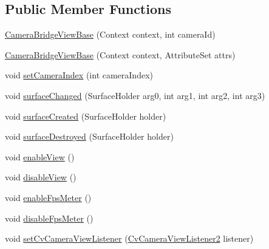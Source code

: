 \subsection*{Public Member Functions}
\begin{DoxyCompactItemize}
\item 
\mbox{\hyperlink{classorg_1_1opencv_1_1android_1_1_camera_bridge_view_base_a6bc4c88825cf0cdaccb9bbe97cd6d280}{Camera\+Bridge\+View\+Base}} (Context context, int camera\+Id)
\item 
\mbox{\hyperlink{classorg_1_1opencv_1_1android_1_1_camera_bridge_view_base_a6e901850af5a8293e9924e155b27eef5}{Camera\+Bridge\+View\+Base}} (Context context, Attribute\+Set attrs)
\item 
void \mbox{\hyperlink{classorg_1_1opencv_1_1android_1_1_camera_bridge_view_base_abd2684c41d7f5e43fb168d051392ec65}{set\+Camera\+Index}} (int camera\+Index)
\item 
void \mbox{\hyperlink{classorg_1_1opencv_1_1android_1_1_camera_bridge_view_base_ac94df92e0db8ea4ad91c2ff0c71317e0}{surface\+Changed}} (Surface\+Holder arg0, int arg1, int arg2, int arg3)
\item 
void \mbox{\hyperlink{classorg_1_1opencv_1_1android_1_1_camera_bridge_view_base_a03e25a12d1621a9e65c8f08702c22de9}{surface\+Created}} (Surface\+Holder holder)
\item 
void \mbox{\hyperlink{classorg_1_1opencv_1_1android_1_1_camera_bridge_view_base_a547f6c285f2a85ecd7ee3de772cf0d63}{surface\+Destroyed}} (Surface\+Holder holder)
\item 
void \mbox{\hyperlink{classorg_1_1opencv_1_1android_1_1_camera_bridge_view_base_a464f9c70ccfd90f8fe7cc599e79dc4fa}{enable\+View}} ()
\item 
void \mbox{\hyperlink{classorg_1_1opencv_1_1android_1_1_camera_bridge_view_base_ab77aa314d6159042eff12ff5bffc5839}{disable\+View}} ()
\item 
void \mbox{\hyperlink{classorg_1_1opencv_1_1android_1_1_camera_bridge_view_base_accb2bd3e829565737c0b606043441ee0}{enable\+Fps\+Meter}} ()
\item 
void \mbox{\hyperlink{classorg_1_1opencv_1_1android_1_1_camera_bridge_view_base_a8b57f5b10201788b0d53a7c85f5f2739}{disable\+Fps\+Meter}} ()
\item 
void \mbox{\hyperlink{classorg_1_1opencv_1_1android_1_1_camera_bridge_view_base_a250bcd8b7c703dd2cad77fb422cee8fd}{set\+Cv\+Camera\+View\+Listener}} (\mbox{\hyperlink{interfaceorg_1_1opencv_1_1android_1_1_camera_bridge_view_base_1_1_cv_camera_view_listener2}{Cv\+Camera\+View\+Listener2}} listener)

\end{DoxyCompactItemize}
